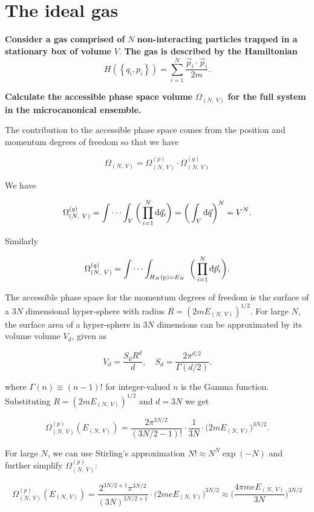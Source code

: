 \documentclass[11pt]{article}
\begin{document}
\section*{The ideal gas}
\label{sec:org19e63cf}

\textbf{Consider a gas comprised of} \(N\) \textbf{non-interacting particles trapped in a stationary box of volume} \(V\). \textbf{The gas is described by the Hamiltonian}
\[
H \left(\left\{q_i, p_i\right\}\right) = \sum_{i=1}^N\frac{\vec{p}_i \cdot \vec{p}_i}{2m}.
\]

\label{sec:org7078320}
\textbf{Calculate the accessible phase space volume} \(\Omega_{(N,~V)}\) \textbf{for the full system in the microcanonical ensemble.}

The contribution to the accessible phase space comes from the position and momentum degrees of freedom so that we have

\[
\Omega_{(N,~V)} = \Omega_{(N,~V)}^{(p)} \cdot \Omega_{(N,~V)}^{(q)}
\]

We have

\[
\Omega_{(N,~V)}^{(q)} = \idotsint_{V} \bigg( \prod_{i=1}^{N} \mathrm{d} \vec{q}_{i} \bigg) = \bigg(\int_{V} \mathrm{d} \vec{q}\bigg)^{N} = V^{N}.
\]

Similarly

\[
\Omega_{(N,~V)}^{(q)} = \idotsint_{H_{N}(\mathrm{p}) = E_{N}} ~\bigg(\prod_{i=1}^{N} \mathrm{d} \vec{p}_{i} \bigg).
\]

The accessible phase space for the momentum degrees of freedom is the surface of a \(3N\) dimensional hyper-sphere with radius \(R = (2 m E_{(N,~V)})^{1/2}\). For large \(N\), the surface area of a hyper-sphere in \(3N\) dimensions can be approximated by its volume volume \(V_d\), given as

\[
V_{d} = \frac{S_{d} R^{d}}{d}, \quad S_{d} = \frac{2 \pi^{d / 2}}{\Gamma (d / 2)}.
\]

where \(\Gamma (n) \equiv (n-1)!\) for integer-valued \(n\) is the Gamma function. Substituting \(R = (2 m E_{(N,~V)})^{1/2}\) and \(d = 3N\) we get

\[
\Omega_{(N,~V)}^{(p)} (E_{(N,~V)}) = \frac{2 \pi^{3N/2}}{(3N/2-1)!} \cdot \frac{1}{3N} \cdot \big(2mE_{(N,~V)}\big)^{3N/2}.
\]

For large \(N\), we can use Stirling's approximation \(N! \approx N^N \exp(-N)\) and further simplify \(\Omega_{(N,~V)}^{(p)}\):

\[
\Omega_{(N,~V)}^{(p)}(E_{(N,~V)}) = \frac{2^{3N/2+1} \pi^{3N/2}}{(3N)^{3N/2+1}} \cdot \big(2meE_{(N,~V)}\big)^{3N/2} \approx \bigg(\frac{4 \pi m e E_{(N,~V)}}{3 N}\bigg)^{3N/2}
\]
\end{document}
